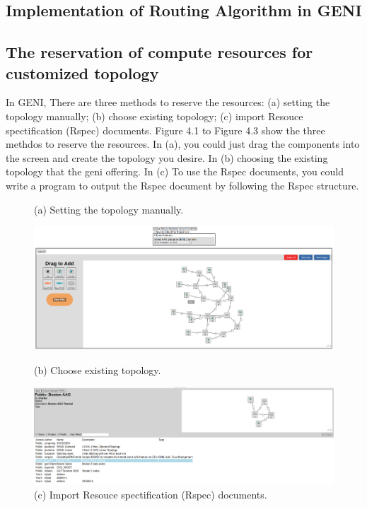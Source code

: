 \documentclass[a4paper,12pt]{report}
\begin{document}
\begin{large}
  \chapter{Implementation of Routing Algorithm in GENI}
  	\section{The reservation of compute resources for customized topology}
		\qquad In GENI, There are three methods to reserve the resources: (a) setting the topology manually; (b) choose existing topology; (c) import Resouce spectification (Rspec) documents. Figure 4.1 to Figure 4.3 show the three methdos to reserve the resources. In (a), you could just drag the components into the screen and create the topology you desire. In (b) choosing the existing topology that the geni offering. In (c) To use the Rspec documents, you could write a program to output the Rspec document by following the Rspec structure.
		\begin{figure}
          \caption{(a) Setting the topology manually.}
          \centering
            \includegraphics[width=1.0\textwidth]{geni_manual.png}
          \caption{(b) Choose existing topology.}
            \includegraphics[width=1.0\textwidth]{choose_existing.png}
          \caption{(c) Import Resouce spectification (Rspec) documents.}

\end{figure}
\end{large}
\end{document}

